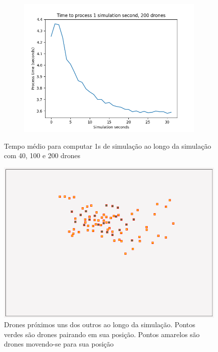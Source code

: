 \begin{figure}
\begin{subfigure}[b]{0.5\textwidth}
        \includegraphics[width=\textwidth]{img/time_process_1s_simulation_200drones.png}
    \end{subfigure}
    \caption{Tempo médio para computar 1s de simulação ao longo da simulação com 40, 100 e 200 drones}
    \label{fig:drone_times}
\end{figure}

\begin{figure}[ht]
    \centering
    \includegraphics[width=.8\textwidth]{img/swarm_peak.png}
    \caption{Drones próximos uns dos outros ao longo da simulação. Pontos verdes são drones pairando em sua posição. Pontos amarelos são drones movendo-se para sua posição }
    \label{fig:time_peak}
\end{figure}